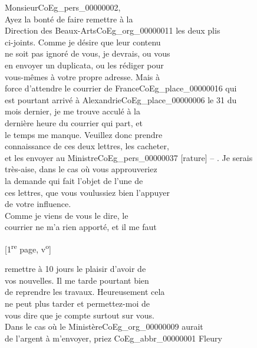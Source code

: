 \documentclass{book}
\begin{document}
\hspace{1cm} Monsieur\gls{CoEg_pers_00000002},\\

\indent Ayez la bonté de faire remettre à la\\
Direction des Beaux-Arts\gls{CoEg_org_00000011} les deux plis\\
ci-joints. Comme je désire que leur contenu\\
ne soit pas ignoré de vous, je devrais, ou vous\\
en envoyer un duplicata, ou les rédiger pour\\
vous-mêmes à votre propre adresse. Mais à\\
force d’attendre le courrier de France\gls{CoEg_place_00000016} qui\\
est pourtant arrivé à Alexandrie\gls{CoEg_place_00000006} le 31 du\\
mois dernier, je me trouve acculé à la\\
dernière heure du courrier qui part, et\\
le temps me manque. Veuillez donc prendre\\
connaissance de ces deux lettres, les cacheter,\\
et les envoyer au Ministre\gls{CoEg_pers_00000037} [rature] – . Je serais\\
très-aise, dans le cas où vous approuveriez\\
la demande qui fait l’objet de l’une de\\
ces lettres, que vous voulussiez bien l’appuyer\\
de votre influence.\\
\indent Comme je viens de vous le dire, le\\
courrier ne m’a rien apporté, et il me faut
{\footnotesize \begin{center} {[1\textsuperscript{re} page, v\textsuperscript{o}]}\end{center}}
\noindent remettre à 10 jours le plaisir d’avoir de\\
vos nouvelles. Il me tarde pourtant bien\\
de reprendre les travaux. Heureusement cela\\
ne peut plus tarder et permettez-moi de\\
vous dire que je compte surtout sur vous.\\
\indent Dans le cas où le Ministère\gls{CoEg_org_00000009} aurait\\
de l’argent à m’envoyer, priez \gls{CoEg_abbr_00000001} Fleury\\
\end{document}
